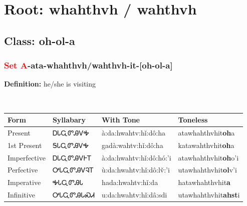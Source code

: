 \needspace{4in}
\section*{Root: whahthvh / wahthvh}
\nopagebreak
{}
\needspace{3in}
\subsection*{Class: oh-ol-a}
\nopagebreak
\needspace{2in}
\subsubsection*{\textcolor{Red}{Set A}{-}ata{-}\textbf{whahthvh/wahthvh}{-}it{-}[oh-ol-a]}
\nopagebreak
\textbf{Definition: } he/she is visiting
\\[0.5em]
\begin{tabularx}{\textwidth}{l X X X}%
\toprule%
\textbf{Form}&\textbf{Syllabary}&\textbf{With Tone}&\textbf{Toneless}\\%
\midrule%
Present&ᎠᏓᏩᏛᎯᏙᎭ&à:da:hwahtv:hǐ:dô:ha&atawhahthvhit\textbf{oh}a\\%
1st Present&ᎦᏓᏩᏛᎯᏙᎭ&gadà:wahtv:hǐ:dô:ha&katawahthvhit\textbf{oh}a\\%
Imperfective&ᎠᏓᏩᏛᎯᏙᎰᎢ&à:da:hwahtv:hǐ:dô:hó:’i&atawhahthvhit\textbf{oh}o'i\\%
Perfective&ᎤᏓᏩᏛᎯᏙᎸᎢ&ù:da:hwahtv:hǐ:dô:lv̌:’i&utawhahthvhit\textbf{ol}v'i\\%
Imperative&ᎭᏓᏩᏛᎯᏓ&hada:hwahtv:hǐ:da&hatawhahthvhit\textbf{a}\\%
Infinitive&ᎤᏓᏩᏛᎯᏓᏍᏗ&u:da:hwahtv:hǐ:dâ:sdi&utawhahthvhit\textbf{ahst}i\\%
\bottomrule%
\end{tabularx}
\\[1em]
\needspace{2in}
